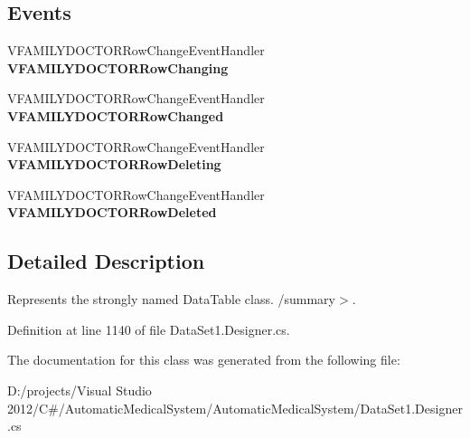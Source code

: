 \subsection*{Events}
\begin{CompactItemize}
\item 
VFAMILYDOCTORRowChangeEventHandler \textbf{VFAMILYDOCTORRowChanging}\label{class_automatic_medical_system_1_1_data_set1_1_1_v_f_a_m_i_l_y_d_o_c_t_o_r_data_table_498ea66835df4100a31dc70815f37427}

\item 
VFAMILYDOCTORRowChangeEventHandler \textbf{VFAMILYDOCTORRowChanged}\label{class_automatic_medical_system_1_1_data_set1_1_1_v_f_a_m_i_l_y_d_o_c_t_o_r_data_table_d8af08b102a2c045388c78047f7502cf}

\item 
VFAMILYDOCTORRowChangeEventHandler \textbf{VFAMILYDOCTORRowDeleting}\label{class_automatic_medical_system_1_1_data_set1_1_1_v_f_a_m_i_l_y_d_o_c_t_o_r_data_table_366fd0773d99becbd66455bc4e2bc192}

\item 
VFAMILYDOCTORRowChangeEventHandler \textbf{VFAMILYDOCTORRowDeleted}\label{class_automatic_medical_system_1_1_data_set1_1_1_v_f_a_m_i_l_y_d_o_c_t_o_r_data_table_bbb6821283638ec5d7b8686c95cf3271}

\end{CompactItemize}


\subsection{Detailed Description}
Represents the strongly named DataTable class. /summary$>$. 

Definition at line 1140 of file DataSet1.Designer.cs.

The documentation for this class was generated from the following file:\begin{CompactItemize}
\item 
D:/projects/Visual Studio 2012/C\#/AutomaticMedicalSystem/AutomaticMedicalSystem/DataSet1.Designer.cs\end{CompactItemize}

